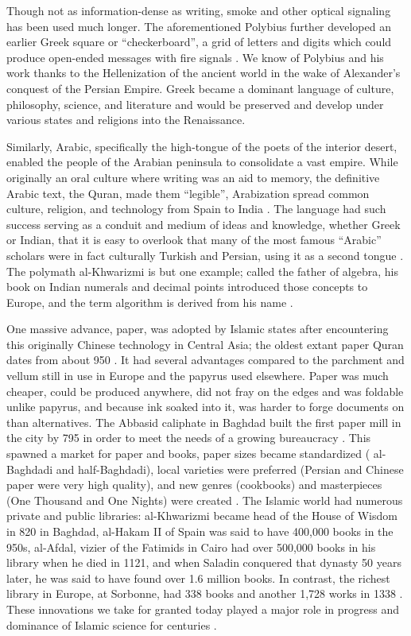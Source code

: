 Though not as information-dense as writing, smoke and other optical signaling has been used much longer.
The aforementioned Polybius further developed an earlier Greek square or ``checkerboard'', a grid of letters and digits which could produce open-ended messages with fire signals \cite[10.43-45]{feldman2017}.
We know of Polybius and his work thanks to the Hellenization of the ancient world in the wake of Alexander's conquest of the Persian Empire.
Greek became a dominant language of culture, philosophy, science, and literature and would be preserved and develop under various states and religions into the Renaissance.

Similarly, Arabic, specifically the high-tongue of the poets of the interior desert, enabled the people of the Arabian peninsula to consolidate a vast empire.
While originally an oral culture where writing was an aid to memory,
the definitive Arabic text, the Quran, made them ``legible'', Arabization spread common culture, religion, and technology from Spain to India \cite[pp. XVIII-8]{mackintosh2019}.
The language had such success serving as a conduit and medium of ideas and knowledge, whether Greek or Indian, that it is easy to overlook that many of the most famous ``Arabic'' scholars were in fact culturally Turkish and Persian, using it as a second tongue \cite{starr2015}. 
The polymath al-Khwarizmi is but one example; called the father of algebra, his book on Indian numerals and decimal points introduced those concepts to Europe, and the term algorithm is derived from his name \cite{arndt1983} \cite[p. 12]{bloom2001}.

One massive advance, paper, was adopted by Islamic states after encountering this originally Chinese technology in Central Asia; the oldest extant paper Quran dates from about 950 \cite[p. 106]{bloom2001}.
It had several advantages compared to the parchment and vellum still in use in Europe and the papyrus used elsewhere.
Paper was much cheaper, could be produced anywhere, did not fray on the edges and was foldable unlike papyrus, and because ink soaked into it, was harder to forge documents on than alternatives. 
The Abbasid caliphate in Baghdad built the first paper mill in the city by 795 in order to meet the needs of a growing bureaucracy \cite[pp. 48-69]{bloom2001}.
This spawned a market for paper and books, paper sizes became standardized ( al-Baghdadi and half-Baghdadi), local varieties were preferred (Persian and Chinese paper were very high quality), and new genres (cookbooks) and masterpieces (One Thousand and One Nights) were created \cite[pp. 48-69]{bloom2001}.
The Islamic world had numerous private and public libraries: al-Khwarizmi became head of the House of Wisdom in 820 in Baghdad, al-Hakam II of Spain was said to have 400,000 books in the 950s, al-Afdal, vizier of the Fatimids in Cairo had over 500,000 books in his library when he died in 1121, and when Saladin conquered that dynasty 50 years later, he was said to have found over 1.6 million books.
In contrast, the richest library in Europe, at Sorbonne, had 338 books and another 1,728 works in 1338 \cite[pp. 117-22]{bloom2001}.
These innovations we take for granted today played a major role in progress and dominance of Islamic science for centuries \cite{hunter1978}.

